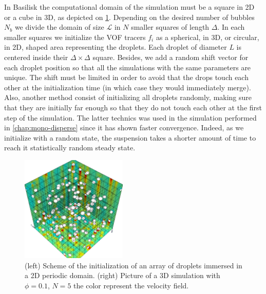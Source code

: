 In Basilisk the computational domain of the simulation must be a square in 2D or a cube in 3D, as depicted on \ref{fig:numscheme}. 
Depending on the desired number of bubbles $N_b$ we divide the domain of size $\mathcal{L}$ in $N$ smaller squares of length $\Delta$.
In each smaller squares we initialize the VOF tracers $f_i$ as a spherical, in 3D, or circular, in 2D, shaped area representing the droplets.
Each droplet of diameter $L$ is centered inside their $\Delta\times \Delta$ square.
Besides, we add a random shift vector for each droplet position so that all the simulations with the same parameters are unique. 
The shift must be limited in order to avoid that the drops touch each other at the initialization time (in which case they would immediately merge).   
Also, another method consist of initializing all droplets randomly, making sure that they are initially far enough so that they do not touch each other at the first step of the simulation.
The latter technics was used in the simulation performed in \ref{chap:mono-disperse} since it has shown faster convergence. 
Indeed, as we initialize with a random state, the suspension takes a shorter amount of time to reach it statistically random steady state. 
\begin{figure}[h!]
    \centering
    \includegraphics[width=0.45\textwidth]{image/3D/PHI01.png}
    \caption{(left) Scheme of the initialization of an array of droplets immersed in a 2D periodic domain.
    (right) Picture of a 3D simulation with $\phi = 0.1$, $N = 5$ the color represent the velocity field.}
    \label{fig:numscheme}
\end{figure}


